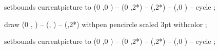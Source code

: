   setbounds currentpicture to
    (0                ,0                   ) --
    (0                ,2*) --
    (,2*) --
    (,0                   ) --
    cycle ;
\stopuseMPgraphic

  draw 
    (0                ,  ) -- 
    (,  ) -- 
    (,2*)
    withpen   pencircle scaled 3pt
    withcolor   ;
    
  setbounds currentpicture to
    (0                ,0                   ) --
    (0                ,2*) --
    (,2*) --
    (,0                   ) --
    cycle ;
\stopuseMPgraphic

\def\startMMundi{
  \setupMPvariables[MMundiTopBar]
    [textWidth=\textwidth,textHeight=0.5\lineheight]
  \useMPgraphic{MMundiTopBar}
}

\def\stopMMundi{
  \setupMPvariables[MMundiBottomBar]
    [textWidth=\textwidth,textHeight=0.5\lineheight]
  \endgraf\useMPgraphic{MMundiBottomBar}
}

\def\ToDo#1{\color[red]{\bf TODO: #1}}
\let\TODO\ToDo

\stopMkIVCode
